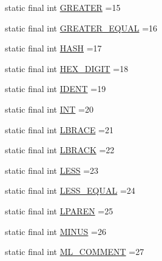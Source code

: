 \begin{DoxyCompactItemize}
\item 
static final int \hyperlink{classorg_1_1tzi_1_1use_1_1parser_1_1testsuite_1_1_test_suite_parser_aedf1444b83e43a1f5ba52c1a99c052c7}{G\-R\-E\-A\-T\-E\-R} =15
\item 
static final int \hyperlink{classorg_1_1tzi_1_1use_1_1parser_1_1testsuite_1_1_test_suite_parser_a778ab00c0bf09351dd967c9c32d38551}{G\-R\-E\-A\-T\-E\-R\-\_\-\-E\-Q\-U\-A\-L} =16
\item 
static final int \hyperlink{classorg_1_1tzi_1_1use_1_1parser_1_1testsuite_1_1_test_suite_parser_a5951cfaeda78cbacc3cf74fb492f9953}{H\-A\-S\-H} =17
\item 
static final int \hyperlink{classorg_1_1tzi_1_1use_1_1parser_1_1testsuite_1_1_test_suite_parser_a915b175140f033bee6e01b2b445fe842}{H\-E\-X\-\_\-\-D\-I\-G\-I\-T} =18
\item 
static final int \hyperlink{classorg_1_1tzi_1_1use_1_1parser_1_1testsuite_1_1_test_suite_parser_aae4c03faf701e886069fb151f7fdc057}{I\-D\-E\-N\-T} =19
\item 
static final int \hyperlink{classorg_1_1tzi_1_1use_1_1parser_1_1testsuite_1_1_test_suite_parser_a03a3586f9e16f8f6f4afe075d05a28ea}{I\-N\-T} =20
\item 
static final int \hyperlink{classorg_1_1tzi_1_1use_1_1parser_1_1testsuite_1_1_test_suite_parser_aaf0ae0ba43c947ed59cbc44b660988e2}{L\-B\-R\-A\-C\-E} =21
\item 
static final int \hyperlink{classorg_1_1tzi_1_1use_1_1parser_1_1testsuite_1_1_test_suite_parser_a9f5c299e1db0fffa489d6662b40a2801}{L\-B\-R\-A\-C\-K} =22
\item 
static final int \hyperlink{classorg_1_1tzi_1_1use_1_1parser_1_1testsuite_1_1_test_suite_parser_a119401942d30428929abc4ea87ee2d0d}{L\-E\-S\-S} =23
\item 
static final int \hyperlink{classorg_1_1tzi_1_1use_1_1parser_1_1testsuite_1_1_test_suite_parser_a54578148f9c6c22bab5e00701299010e}{L\-E\-S\-S\-\_\-\-E\-Q\-U\-A\-L} =24
\item 
static final int \hyperlink{classorg_1_1tzi_1_1use_1_1parser_1_1testsuite_1_1_test_suite_parser_a3de9dd3b40c72490edbfbc00365c24bb}{L\-P\-A\-R\-E\-N} =25
\item 
static final int \hyperlink{classorg_1_1tzi_1_1use_1_1parser_1_1testsuite_1_1_test_suite_parser_a0a9f89a43b6a60b39bec9596ec5578e9}{M\-I\-N\-U\-S} =26
\item 
static final int \hyperlink{classorg_1_1tzi_1_1use_1_1parser_1_1testsuite_1_1_test_suite_parser_aa7ebb6e874594c0fc22c5e8ce270eae6}{M\-L\-\_\-\-C\-O\-M\-M\-E\-N\-T} =27

\end{DoxyCompactItemize}

